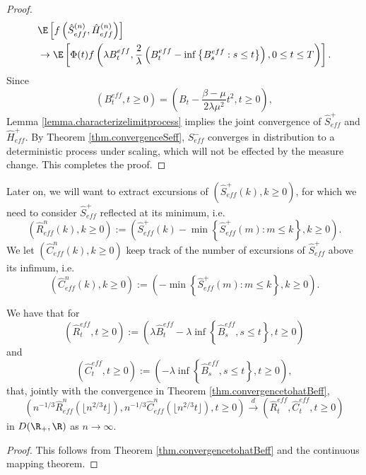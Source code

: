 \begin{proof}
\begin{align*}
    &\E\left[f\left(\hat{S}_{eff}^{(n)},  \hat{H}_{eff}^{(n)}\right) \right]\\
    &\to \E\left[\Phi(t)f\left(\lambda B_t^{eff},\frac{2}{\lambda}\left(B_t^{eff}-\inf\left\{B_s^{eff}:s\leq t\right\}\right),0\leq t \leq T\right)\right].
\end{align*}
Since $$(B^{eff}_t,t\geq 0)=\left(B_t-\frac{\beta - \mu}{2\lambda \mu^2}t^2,t\geq 0\right),$$
Lemma \ref{lemma.characterizelimitprocess} implies the joint convergence of $\hat{S}^+_{eff}$ and $\hat{H}^+_{eff}$. By Theorem \ref{thm.convergenceSeff}, $S^-_{eff}$ converges in distribution to a deterministic process under scaling, which will not be effected by the measure change. This completes the proof. 
\end{proof}

Later on, we will want to extract excursions of $(\hat{S}_{eff}^+(k), k\geq 0)$, for which we need to consider $\hat{S}^+_{eff}$ reflected at its minimum, i.e.
$$(\hat{R}^n_{eff}(k),k\geq 0):=\left(\hat{S}_{eff}^+(k)-\min\left\{\hat{S}_{eff}^+(m):m\leq k\right\},k\geq 0\right).$$ We let $(\hat{C}^n_{eff}(k), k\geq 0)$ keep track of the number of excursions of $\hat{S}^+_{eff}$ above its infimum, i.e.
$$(\hat{C}^n_{eff}(k),k\geq 0):=\left(-\min\left\{\hat{S}_{eff}^+(m):m\leq k\right\},k\geq 0\right).$$
\begin{corollary}\label{cor.convergencereflected}
We have that for 
$$(\hat{R}^{eff}_t,t\geq 0):=\left(\lambda \hat{B}^{eff}_t-\lambda\inf\left\{\hat{B}^{eff}_s, s\leq t\right\},t\geq 0\right)$$
and
$$(\hat{C}^{eff}_t,t\geq 0):=\left(-\lambda\inf\left\{\hat{B}^{eff}_s, s\leq t\right\},t\geq 0\right),$$
that, jointly with the convergence in Theorem \ref{thm.convergencetohatBeff},
$$\left(n^{-1/3}\hat{R}^n_{eff}\left(\lfloor n^{2/3}t\rfloor\right),n^{-1/3}\hat{C}^n_{eff}\left(\lfloor n^{2/3}t\rfloor\right), t\geq 0\right)\overset{d}{\to}\left(\hat{R}^{eff}_t,\hat{C}^{eff}_t,t\geq 0\right)$$
in $D(\R_+,\R)$ as $n\to \infty$.
\end{corollary}
\begin{proof}
This follows from Theorem \ref{thm.convergencetohatBeff} and the continuous mapping theorem.
\end{proof}




